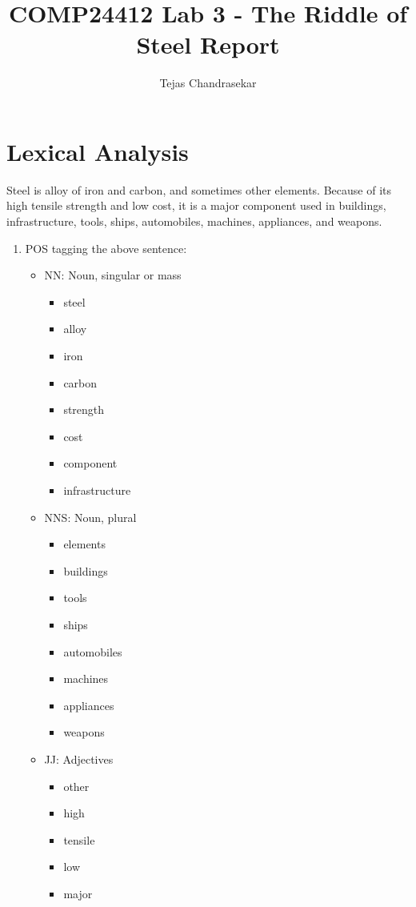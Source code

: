 \documentclass{article}
\title{COMP24412 Lab 3 - The Riddle of Steel Report}
\author{Tejas Chandrasekar}
\begin{document}
\maketitle
\newpage

\section{Lexical Analysis}
Steel is alloy of iron and carbon, and sometimes other elements. Because of
its high tensile strength and low cost, it is a major component used in
buildings, infrastructure, tools, ships, automobiles, machines, appliances, and
weapons.\par
\begin{enumerate}
  \item POS tagging the above sentence:
  \begin{itemize}
    \item NN: Noun, singular or mass
    \begin{itemize}
      \item steel
      \item alloy
      \item iron
      \item carbon
      \item strength
      \item cost
      \item component
      \item infrastructure
    \end{itemize}
    \item NNS: Noun, plural
    \begin{itemize}
      \item elements
      \item buildings
      \item tools
      \item ships
      \item automobiles
      \item machines
      \item appliances
      \item weapons
    \end{itemize}
    \item JJ: Adjectives
    \begin{itemize}
      \item other
      \item high
      \item tensile
      \item low
      \item major

\end{itemize}
\end{itemize}
\end{enumerate}
\end{document}
